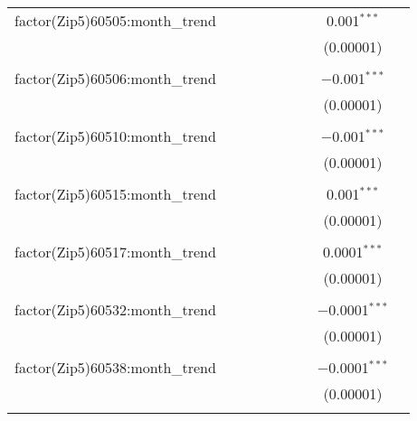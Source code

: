 \begin{table}[H]
{\begin{tabular}{@{\extracolsep{5pt}}lcccccccc}
  factor(Zip5)60505:month\_trend &  &  &  &  &  &  & 0.001$^{***}$ &  \\  

   &  &  &  &  &  &  & (0.00001) &  \\  

   & & & & & & & & \\  

  factor(Zip5)60506:month\_trend &  &  &  &  &  &  & $-$0.001$^{***}$ &  \\  

   &  &  &  &  &  &  & (0.00001) &  \\  

   & & & & & & & & \\  

  factor(Zip5)60510:month\_trend &  &  &  &  &  &  & $-$0.001$^{***}$ &  \\  

   &  &  &  &  &  &  & (0.00001) &  \\  

   & & & & & & & & \\  

  factor(Zip5)60515:month\_trend &  &  &  &  &  &  & 0.001$^{***}$ &  \\  

   &  &  &  &  &  &  & (0.00001) &  \\  

   & & & & & & & & \\  

  factor(Zip5)60517:month\_trend &  &  &  &  &  &  & 0.0001$^{***}$ &  \\  

   &  &  &  &  &  &  & (0.00001) &  \\  

   & & & & & & & & \\  

  factor(Zip5)60532:month\_trend &  &  &  &  &  &  & $-$0.0001$^{***}$ &  \\  

   &  &  &  &  &  &  & (0.00001) &  \\  

   & & & & & & & & \\  

  factor(Zip5)60538:month\_trend &  &  &  &  &  &  & $-$0.0001$^{***}$ &  \\  

   &  &  &  &  &  &  & (0.00001) &  \\  

   & & & & & & & & \\  


\end{tabular}}
\end{table}
